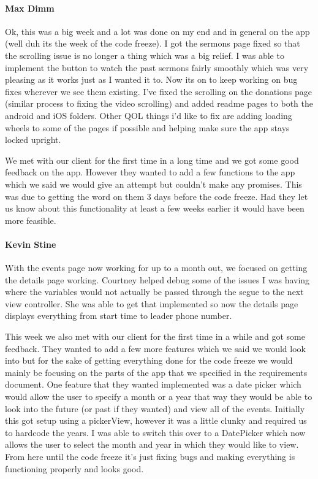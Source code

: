			\paragraph{Max Dimm}
			Ok, this was a big week and a lot was done on my end and in general on the app (well duh its the week of the code freeze). I got the sermons page fixed so that the scrolling issue is no longer a thing which was a big relief. I was able to implement the button to watch the past sermons fairly smoothly which was very pleasing as it works just as I wanted it to. Now its on to keep working on bug fixes wherever we see them existing. I've fixed the scrolling on the donations page (similar process to fixing the video scrolling) and added readme pages to both the android and iOS folders. Other QOL things i'd like to fix are adding loading wheels to some of the pages if possible and helping make sure the app stays locked upright.

We met with our client for the first time in a long time and we got some good feedback on the app. However they wanted to add a few functions to the app which we said we would give an attempt but couldn't make any promises. This was due to getting the word on them 3 days before the code freeze. Had they let us know about this functionality at least a few weeks earlier it would have been more feasible.

			\paragraph{Kevin Stine}
			With the events page now working for up to a month out, we focused on getting the details page working. Courtney helped debug some of the issues I was having where the variables would not actually be passed through the segue to the next view controller. She was able to get that implemented so now the details page displays everything from start time to leader phone number.

This week we also met with our client for the first time in a while and got some feedback. They wanted to add a few more features which we said we would look into but for the sake of getting everything done for the code freeze we would mainly be focusing on the parts of the app that we specified in the requirements document. One feature that they wanted implemented was a date picker which would allow the user to specify a month or a year that way they would be able to look into the future (or past if they wanted) and view all of the events. Initially this got setup using a pickerView, however it was a little clunky and required us to hardcode the years. I was able to switch this over to a DatePicker which now allows the user to select the month and year in which they would like to view. From here until the code freeze it's just fixing bugs and making everything is functioning properly and looks good.

